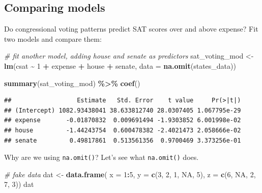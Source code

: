\documentclass[
]{book}
\newenvironment{Shaded}{\begin{snugshade}}{\end{snugshade}}
\newcommand{\CommentTok}[1]{\textcolor[rgb]{0.56,0.35,0.01}{\textit{#1}}}
\newcommand{\DataTypeTok}[1]{\textcolor[rgb]{0.13,0.29,0.53}{#1}}
\newcommand{\DecValTok}[1]{\textcolor[rgb]{0.00,0.00,0.81}{#1}}
\newcommand{\KeywordTok}[1]{\textcolor[rgb]{0.13,0.29,0.53}{\textbf{#1}}}
\newcommand{\NormalTok}[1]{#1}
\newcommand{\OperatorTok}[1]{\textcolor[rgb]{0.81,0.36,0.00}{\textbf{#1}}}
\newcommand{\OtherTok}[1]{\textcolor[rgb]{0.56,0.35,0.01}{#1}}
\newcommand{\StringTok}[1]{\textcolor[rgb]{0.31,0.60,0.02}{#1}}
\begin{document}
\hypertarget{comparing-models}{%
\subsection{Comparing models}\label{comparing-models}}

Do congressional voting patterns predict SAT scores over and above expense? Fit two models and compare them:

\begin{Shaded}
\begin{Highlighting}[]
  \CommentTok{\# fit another model, adding house and senate as predictors}
\NormalTok{  sat\_voting\_mod \textless{}{-}}\StringTok{ }\KeywordTok{lm}\NormalTok{(csat }\OperatorTok{\textasciitilde{}}\StringTok{ }\DecValTok{1} \OperatorTok{+}\StringTok{ }\NormalTok{expense }\OperatorTok{+}\StringTok{ }\NormalTok{house }\OperatorTok{+}\StringTok{ }\NormalTok{senate,}
                        \DataTypeTok{data =} \KeywordTok{na.omit}\NormalTok{(states\_data))}

  \KeywordTok{summary}\NormalTok{(sat\_voting\_mod) }\OperatorTok{\%\textgreater{}\%}\StringTok{ }\KeywordTok{coef}\NormalTok{()}
\end{Highlighting}
\end{Shaded}

\begin{verbatim}
##                  Estimate   Std. Error    t value     Pr(>|t|)
## (Intercept) 1082.93438041 38.633812740 28.0307405 1.067795e-29
## expense       -0.01870832  0.009691494 -1.9303852 6.001998e-02
## house         -1.44243754  0.600478382 -2.4021473 2.058666e-02
## senate         0.49817861  0.513561356  0.9700469 3.373256e-01
\end{verbatim}

Why are we using \texttt{na.omit()}? Let's see what \texttt{na.omit()} does.

\begin{Shaded}
\begin{Highlighting}[]
\CommentTok{\# fake data}
\NormalTok{dat \textless{}{-}}\StringTok{ }\KeywordTok{data.frame}\NormalTok{(}
  \DataTypeTok{x =} \DecValTok{1}\OperatorTok{:}\DecValTok{5}\NormalTok{,}
  \DataTypeTok{y =} \KeywordTok{c}\NormalTok{(}\DecValTok{3}\NormalTok{, }\DecValTok{2}\NormalTok{, }\DecValTok{1}\NormalTok{, }\OtherTok{NA}\NormalTok{, }\DecValTok{5}\NormalTok{),}
  \DataTypeTok{z =} \KeywordTok{c}\NormalTok{(}\DecValTok{6}\NormalTok{, }\OtherTok{NA}\NormalTok{, }\DecValTok{2}\NormalTok{, }\DecValTok{7}\NormalTok{, }\DecValTok{3}\NormalTok{))}
\NormalTok{dat}
\end{Highlighting}
\end{Shaded}
\end{document}
